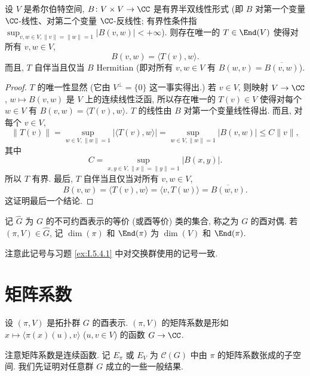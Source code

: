 \begin{lemma}[有界半双线性形式]
\label{lem:IV.2.7}
设 $V$ 是希尔伯特空间, $B \colon V \times V \to \CC$ 是有界半双线性形式 (即 $B$ 对第一个变量 $\CC$-线性、对第二个变量 $\CC$-反线性; 有界性条件指 $\sup_{v,w \in V, \|v\| = \|w\| = 1}|B(v, w)| < +\infty$).
则存在唯一的 $T \in \End(V)$ 使得对所有 $v, w \in V$,
\[
B(v, w) = \langle T(v), w \rangle.
\]
而且, $T$ 自伴当且仅当 $B$ Hermitian (即对所有 $v, w \in V$ 有 $B(w, v) = \overline{B(v, w)}$).
\end{lemma}

\begin{proof}
$T$ 的唯一性显然 (它由 $V^{\perp} = \{0\}$ 这一事实得出.)
若 $v \in V$, 则映射 $V \to \CC$, $w \longmapsto B(v, w)$ 是 $V$ 上的连续线性泛函, 所以存在唯一的 $T(v) \in V$ 使得对每个 $w \in V$ 有 $B(v, w) = \langle T(v), w \rangle$. $T$ 的线性由 $B$ 对第一个变量线性得出. 而且, 对每个 $v \in V$,
\[
\|T(v)\| = \sup_{w \in V, \|w\| = 1}|\langle T(v), w \rangle| = \sup_{w \in V, \|w\| = 1}|B(v, w)| \leq C\|v\|,
\]
其中
\[
C = \sup_{x,y \in V, \|x\| = \|y\| = 1}|B(x, y)|.
\]
所以 $T$ 有界.
最后, $T$ 自伴当且仅当对所有 $v, w \in V$,
\[
B(v, w) = \langle T(v), w \rangle = \langle v, T(w) \rangle = \overline{B(w, v)}.
\]
这证明最后一个结论.
\end{proof}

\begin{definition}
\label{def:IV.2.8}
记 $\widehat{G}$ 为 $G$ 的不可约酉表示的等价 (或酉等价) 类的集合, 称之为 $G$ 的酉对偶.
若 $(\pi, V) \in \widehat{G}$, 记 $\dim(\pi)$ 和 $\End(\pi)$ 为 $\dim(V)$ 和 $\End(\pi)$.
\end{definition}

注意此记号与习题 \ref{ex:I.5.4.1} 中对交换群使用的记号一致.

\section{矩阵系数}

\begin{definition}
\label{def:IV.3.1}
设 $(\pi, V)$ 是拓扑群 $G$ 的酉表示. $(\pi, V)$ 的矩阵系数是形如 $x \longmapsto \langle \pi(x)(u), v \rangle$ ($u, v \in V$) 的函数 $G \to \CC$.
\end{definition}

注意矩阵系数是连续函数. 记 $E_{\pi}$ 或 $E_V$ 为 $\mathcal{C}(G)$ 中由 $\pi$ 的矩阵系数张成的子空间.
我们先证明对任意群 $G$ 成立的一些一般结果.

